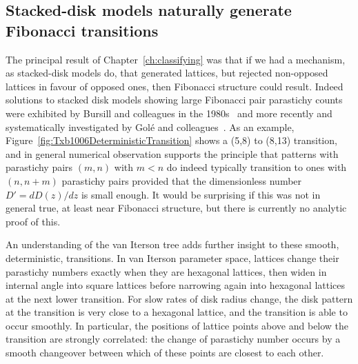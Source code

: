 \clearpage
\subsection{Stacked-disk models naturally generate Fibonacci transitions}
%

The principal result of Chapter~\ref{ch:classifying} was that if we had a mechanism, as stacked-disk models do, that generated lattices, but rejected non-opposed lattices in favour of opposed ones, then Fibonacci structure could result.   
Indeed solutions to stacked disk models showing large Fibonacci pair parastichy counts were exhibited by Bursill and colleagues in the 1980s~\cite{bursillSpiralLatticeConcepts1987,xudongPackingEqualDiscs1989} and more recently and systematically investigated by Gol\'e and colleagues~\cite{goleFibonacciQuasisymmetricPhyllotaxis2016}.
 As an example, Figure~\ref{fig:Txb1006DeterministicTransition} shows a (5,8) to (8,13) transition, and in general numerical observation supports the principle that patterns with parastichy pairs $(m,n)$ with $m<n$ do indeed typically transition to ones with $(n,n+m)$ parastichy pairs provided that the dimensionless number $D'=dD(z)/dz$ is small enough. It would be surprising if this was not in general true, at least near Fibonacci structure, but there is currently no analytic proof of this.
 
 An understanding of the van Iterson tree adds further insight to these smooth, deterministic, transitions. In van Iterson parameter space, lattices change their parastichy numbers exactly when they are hexagonal lattices, then widen in internal angle into square lattices before narrowing again into hexagonal lattices at the next lower transition.  For slow rates of disk radius change, the disk pattern at the transition is very close to a hexagonal lattice, and the transition is able to occur smoothly. In particular, the positions of lattice points above and below the transition are strongly correlated: the change of parastichy number occurs by a smooth changeover between which of these points are closest to each other. 
 
